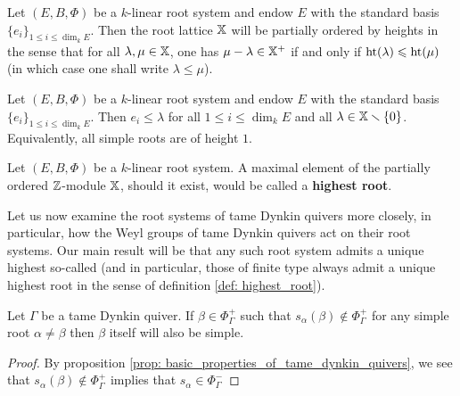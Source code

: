             \begin{proposition} \label{prop: roots_are_partially_ordered_by_heights}
                Let $(E, B, \Phi)$ be a $k$-linear root system and endow $E$ with the standard basis $\{e_i\}_{1 \leq i \leq \dim_k E}$. Then the root lattice $\mathbb{X}$ will be partially ordered by heights in the sense that for all $\lambda, \mu \in \mathbb{X}$, one has $\mu - \lambda \in \mathbb{X}^+$ if and only if $\operatorname{ht}(\lambda) \leqslant \operatorname{ht}(\mu)$ (in which case one shall write $\lambda \leq \mu$).
            \end{proposition}
            \begin{corollary} \label{coro: heights_of_simple_roots}
                Let $(E, B, \Phi)$ be a $k$-linear root system and endow $E$ with the standard basis $\{e_i\}_{1 \leq i \leq \dim_k E}$. Then $e_i \leq \lambda$ for all $1 \leq i \leq \dim_k E$ and all $\lambda \in \mathbb{X} \smallsetminus \{0\}$. Equivalently, all simple roots are of height $1$.
            \end{corollary}
            \begin{definition} \label{def: highest_root}
                Let $(E, B, \Phi)$ be a $k$-linear root system. A maximal element of the partially ordered $\mathbb{Z}$-module $\mathbb{X}$, should it exist, would be called a \textbf{highest root}.
            \end{definition}
            
            Let us now examine the root systems of tame Dynkin quivers more closely, in particular, how the Weyl groups of tame Dynkin quivers act on their root systems. Our main result will be that any such root system admits a unique highest so-called  (and in particular, those of finite type always admit a unique highest root in the sense of definition \ref{def: highest_root}).
            \begin{lemma} \label{lemma: reflections_of_simple_roots}
                Let $\Gamma$ be a tame Dynkin quiver. If $\beta \in \Phi_{\Gamma}^+$ such that $s_{\alpha}(\beta) \not \in \Phi_{\Gamma}^+$ for any simple root $\alpha \not = \beta$ then $\beta$ itself will also be simple. 
            \end{lemma}
                \begin{proof}
                    By proposition \ref{prop: basic_properties_of_tame_dynkin_quivers}, we see that $s_{\alpha}(\beta) \not \in \Phi_{\Gamma}^+$ implies that $s_{\alpha} \in \Phi_{\Gamma}^-$
                \end{proof}
            
